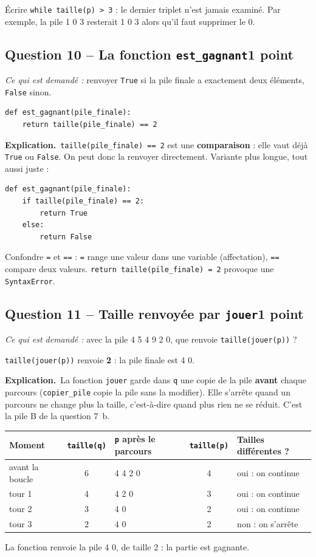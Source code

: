 \documentclass[11pt, a4paper]{exam}
\newcommand{\code}[1]{\texttt{#1}}
\newcommand{\Qt}[2]{\subsection*{#1\hfill{\normalfont\small #2}}}
\newcommand{\rappel}[1]{\noindent\textit{Ce qui est demandé :} #1\par\smallskip}
\newcommand{\explication}{\noindent\textbf{Explication.}\ }
\begin{document}
\begin{erreur}
Écrire \code{while taille(p) > 3} : le dernier triplet n'est jamais examiné. Par exemple, la pile 1 0 3 resterait 1 0 3 alors qu'il faut supprimer le 0.
\end{erreur}

\Qt{Question 10 -- La fonction \code{est\_gagnant}}{1 point}
\rappel{renvoyer \code{True} si la pile finale a exactement deux éléments, \code{False} sinon.}
\begin{reponse}
\begin{lstlisting}
def est_gagnant(pile_finale):
    return taille(pile_finale) == 2
\end{lstlisting}
\end{reponse}
\explication \code{taille(pile\_finale) == 2} est une \textbf{comparaison} : elle vaut déjà \code{True} ou \code{False}. On peut donc la renvoyer directement. Variante plus longue, tout aussi juste :
\begin{lstlisting}
def est_gagnant(pile_finale):
    if taille(pile_finale) == 2:
        return True
    else:
        return False
\end{lstlisting}

\begin{erreur}
Confondre \code{=} et \code{==} : \code{=} range une valeur dans une variable (affectation), \code{==} compare deux valeurs. \code{return taille(pile\_finale) = 2} provoque une \code{SyntaxError}.
\end{erreur}

\Qt{Question 11 -- Taille renvoyée par \code{jouer}}{1 point}
\rappel{avec la pile 4 5 4 9 2 0, que renvoie \code{taille(jouer(p))} ?}
\begin{reponse}
\code{taille(jouer(p))} renvoie \textbf{2} : la pile finale est 4 0.
\end{reponse}
\explication La fonction \code{jouer} garde dans \code{q} une copie de la pile \textbf{avant} chaque parcours (\code{copier\_pile} copie la pile sans la modifier). Elle s'arrête quand un parcours ne change plus la taille, c'est-à-dire quand plus rien ne se réduit. C'est la pile B de la question 7~b.
\begin{center}\small
\begin{tabular}{|l|c|l|c|l|}\hline
Moment & \code{taille(q)} & \code{p} après le parcours & \code{taille(p)} & Tailles différentes ? \\\hline
avant la boucle & 6 & 4 4 2 0 & 4 & oui : on continue \\
tour 1 & 4 & 4 2 0 & 3 & oui : on continue \\
tour 2 & 3 & 4 0 & 2 & oui : on continue \\
tour 3 & 2 & 4 0 & 2 & non : on s'arrête \\\hline
\end{tabular}
\end{center}
La fonction renvoie la pile 4 0, de taille 2 : la partie est gagnante.
\end{document}
